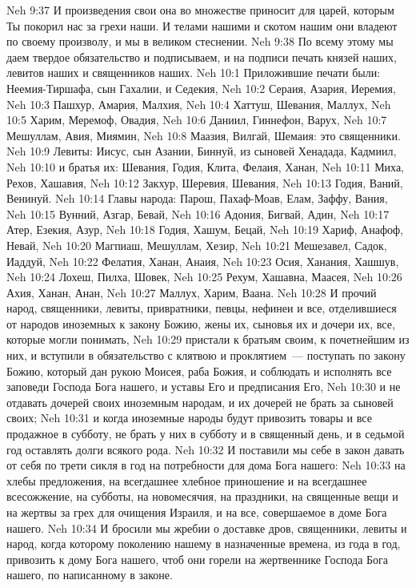 \vs Neh 9:37 И произведения свои она во множестве приносит для царей, которым Ты покорил нас за грехи наши. И телами нашими и скотом нашим они владеют по своему произволу, и мы в великом стеснении.
\vs Neh 9:38 По всему этому мы даем твердое обязательство и подписываем, и на подписи печать князей наших, левитов наших и священников наших.
\vs Neh 10:1 Приложившие печати были: Неемия-Тиршафа, сын Гахалии, и Седекия,
\vs Neh 10:2 Сераия, Азария, Иеремия,
\vs Neh 10:3 Пашхур, Амария, Малхия,
\vs Neh 10:4 Хаттуш, Шевания, Маллух,
\vs Neh 10:5 Харим, Меремоф, Овадия,
\vs Neh 10:6 Даниил, Гиннефон, Варух,
\vs Neh 10:7 Мешуллам, Авия, Миямин,
\vs Neh 10:8 Маазия, Вилгай, Шемаия: это священники.
\vs Neh 10:9 Левиты: Иисус, сын Азании, Биннуй, из сыновей Хенадада, Кадмиил,
\vs Neh 10:10 и братья их: Шевания, Годия, Клита, Фелаия, Ханан,
\vs Neh 10:11 Миха, Рехов, Хашавия,
\vs Neh 10:12 Закхур, Шеревия, Шевания,
\vs Neh 10:13 Годия, Ваний, Венинуй.
\vs Neh 10:14 Главы народа: Парош, Пахаф-Моав, Елам, Заффу, Вания,
\vs Neh 10:15 Вунний, Азгар, Бевай,
\vs Neh 10:16 Адония, Бигвай, Адин,
\vs Neh 10:17 Атер, Езекия, Азур,
\vs Neh 10:18 Годия, Хашум, Бецай,
\vs Neh 10:19 Хариф, Анафоф, Невай,
\vs Neh 10:20 Магпиаш, Мешуллам, Хезир,
\vs Neh 10:21 Мешезавел, Садок, Иаддуй,
\vs Neh 10:22 Фелатия, Ханан, Анаия,
\vs Neh 10:23 Осия, Ханания, Хашшув,
\vs Neh 10:24 Лохеш, Пилха, Шовек,
\vs Neh 10:25 Рехум, Хашавна, Маасея,
\vs Neh 10:26 Ахия, Ханан, Анан,
\vs Neh 10:27 Маллух, Харим, Ваана.
\vs Neh 10:28 И прочий народ, священники, левиты, привратники, певцы, нефинеи и все, отделившиеся от народов иноземных к закону Божию, жены их, сыновья их и дочери их, все, которые могли понимать,
\vs Neh 10:29 пристали к братьям своим, к почетнейшим из них, и вступили в обязательство с клятвою и проклятием~--- поступать по закону Божию, который дан рукою Моисея, раба Божия, и соблюдать и исполнять все заповеди Господа Бога нашего, и уставы Его и предписания Его,
\vs Neh 10:30 и не отдавать дочерей своих иноземным народам, и их дочерей не брать за сыновей своих;
\vs Neh 10:31 и когда иноземные народы будут привозить товары и все продажное в субботу, не брать у них в субботу и в священный день, и в седьмой год оставлять долги всякого рода.
\vs Neh 10:32 И поставили мы себе в закон давать от себя по трети сикля в год на потребности для дома Бога нашего:
\vs Neh 10:33 на хлебы предложения, на всегдашнее хлебное приношение и на всегдашнее всесожжение, на субботы, на новомесячия, на праздники, на священные вещи и на жертвы за грех для очищения Израиля, и на все, совершаемое в доме Бога нашего.
\vs Neh 10:34 И бросили мы жребии о доставке дров, священники, левиты и народ, когда которому поколению нашему в назначенные времена, из года в год, привозить  к дому Бога нашего, чтоб они горели на жертвеннике Господа Бога нашего, по написанному в законе.
